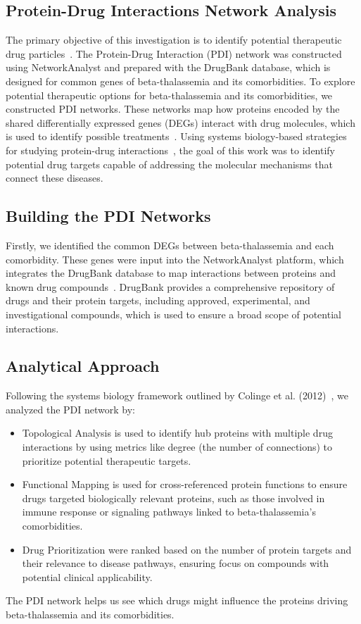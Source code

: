 \vspace*{-\parskip}
\subsection{Protein-Drug Interactions Network Analysis}
\label{sec:pdi_network}

The primary objective of this investigation is to identify potential therapeutic drug particles~\cite{pdi_ref1}. The Protein-Drug Interaction (PDI) network was constructed using NetworkAnalyst and prepared with the DrugBank database, which is designed for common genes of beta-thalassemia and its comorbidities. To explore potential therapeutic options for beta-thalassemia and its comorbidities, we constructed PDI networks. These networks map how proteins encoded by the shared differentially expressed genes (DEGs) interact with drug molecules, which is used to identify possible treatments~\cite{pdi_ref2}. Using systems biology-based strategies for studying protein-drug interactions~\cite{pdi_ref3}, the goal of this work was to identify potential drug targets capable of addressing the molecular mechanisms that connect these diseases.

\subsection*{Building the PDI Networks}

Firstly, we identified the common DEGs between beta-thalassemia and each comorbidity. These genes were input into the NetworkAnalyst platform, which integrates the DrugBank database to map interactions between proteins and known drug compounds~\cite{pdi_ref1}. DrugBank provides a comprehensive repository of drugs and their protein targets, including approved, experimental, and investigational compounds, which is used to ensure a broad scope of potential interactions.

\subsection*{Analytical Approach}

Following the systems biology framework outlined by Colinge et al. (2012)~\cite{pdi_colinge}, we analyzed the PDI network by:
\begin{itemize}
    \item Topological Analysis is used to identify hub proteins with multiple drug interactions by using metrics like degree (the number of connections) to prioritize potential therapeutic targets.
    \item Functional Mapping is used for cross-referenced protein functions to ensure drugs targeted biologically relevant proteins, such as those involved in immune response or signaling pathways linked to beta-thalassemia’s comorbidities.
    \item Drug Prioritization were ranked based on the number of protein targets and their relevance to disease pathways, ensuring focus on compounds with potential clinical applicability.
\end{itemize}
The PDI network helps us see which drugs might influence the proteins driving beta-thalassemia and its comorbidities.


